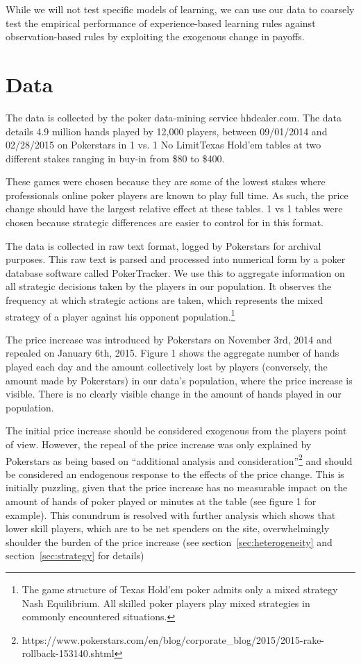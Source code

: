 \documentclass[12pt]{article}
\begin{document}
While we will not test specific models of learning, we can use our data to coarsely test the empirical performance of experience-based learning rules against observation-based rules by exploiting the exogenous change in payoffs.


\section{Data} \label{sec:data}

The data is collected by the poker data-mining service hhdealer.com. The data details 4.9 million hands played by 12,000 players, between 09/01/2014 and 02/28/2015 on Pokerstars in 1 vs. 1 No LimitTexas Hold’em tables at two different stakes ranging in buy-in from \$80 to \$400.

These games were chosen because they are some of the lowest stakes where professionals online poker players are known to play full time. As such, the price change should have the largest relative effect at these tables. 1 vs 1 tables were chosen because strategic differences are easier to control for in this format.

The data is collected in raw text format, logged by Pokerstars for archival purposes. This raw text is parsed and processed into numerical form by a poker database software called PokerTracker. We use this to aggregate information on all strategic decisions taken by the players in our population. It observes the frequency at which strategic actions are taken, which represents the mixed strategy of a player against his opponent population.\footnote{The game structure of Texas Hold'em poker admits only a mixed strategy Nash Equilibrium. All skilled poker players play mixed strategies in commonly encountered situations.}

The price increase was introduced by Pokerstars on November 3rd, 2014 and repealed on January 6th, 2015. Figure 1 shows the aggregate number of hands played each day and the amount collectively lost by players (conversely, the amount made by Pokerstars) in our data’s population, where the price increase is visible. There is no clearly visible change in the amount of hands played in our population.

The initial price increase should be considered exogenous from the players point of view. However, the repeal of the price increase was only explained by Pokerstars as being based on “additional analysis and consideration”\footnote{https://www.pokerstars.com/en/blog/corporate\_blog/2015/2015-rake-rollback-153140.shtml} and should be considered an endogenous response to the effects of the price change. This is initially puzzling, given that the price increase has no measurable impact on the amount of hands of poker played or minutes at the table (see figure 1 for example). This conundrum is resolved with further analysis which shows that lower skill players, which are to be net spenders on the site, overwhelmingly shoulder the burden of the price increase (see section~\ref{sec:heterogeneity} and section~\ref{sec:strategy} for details)
\end{document}
